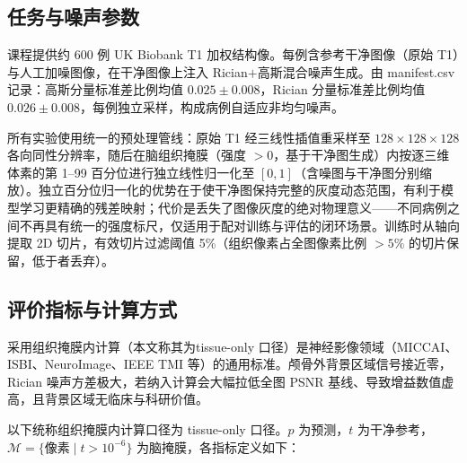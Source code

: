 \documentclass[UTF8,a4paper,12pt]{ctexart}
\begin{document}
\subsection{任务与噪声参数}
课程提供约 600 例 UK Biobank T1 加权结构像。每例含参考干净图像（原始 T1）与人工加噪图像，在干净图像上注入 Rician$+$高斯混合噪声生成。由 manifest.csv 记录：高斯分量标准差比例均值 $0.025 \pm 0.008$，Rician 分量标准差比例均值 $0.026 \pm 0.008$，每例独立采样，构成病例自适应非均匀噪声。

所有实验使用统一的预处理管线：原始 T1 经三线性插值重采样至 $128 \times 128 \times 128$ 各向同性分辨率，随后在脑组织掩膜（强度 $> 0$，基于干净图生成）内按逐三维体素的第 1--99 百分位进行独立线性归一化至 $[0,1]$（含噪图与干净图分别缩放）。独立百分位归一化的优势在于使干净图保持完整的灰度动态范围，有利于模型学习更精确的残差映射；代价是丢失了图像灰度的绝对物理意义——不同病例之间不再具有统一的强度标尺，仅适用于配对训练与评估的闭环场景。训练时从轴向提取 2D 切片，有效切片过滤阈值 5\%（组织像素占全图像素比例 $>5\%$ 的切片保留，低于者丢弃）。

\subsection{评价指标与计算方式}
\label{sec:metrics}

采用组织掩膜内计算（本文称其为tissue-only 口径）是神经影像领域（MICCAI、ISBI、NeuroImage、IEEE TMI 等）的通用标准。颅骨外背景区域信号接近零，Rician 噪声方差极大，若纳入计算会大幅拉低全图 PSNR 基线、导致增益数值虚高，且背景区域无临床与科研价值。

以下统称组织掩膜内计算口径为 tissue-only 口径。$p$ 为预测，$t$ 为干净参考，$\mathcal{M} = \{\text{像素} \mid t > 10^{-6}\}$ 为脑掩膜，各指标定义如下：
\end{document}
